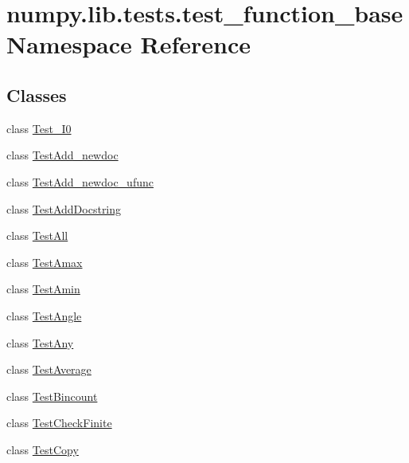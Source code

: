 \hypertarget{namespacenumpy_1_1lib_1_1tests_1_1test__function__base}{}\section{numpy.\+lib.\+tests.\+test\+\_\+function\+\_\+base Namespace Reference}
\label{namespacenumpy_1_1lib_1_1tests_1_1test__function__base}
\subsection*{Classes}
\begin{DoxyCompactItemize}
\item 
class \hyperlink{classnumpy_1_1lib_1_1tests_1_1test__function__base_1_1Test__I0}{Test\+\_\+\+I0}
\item 
class \hyperlink{classnumpy_1_1lib_1_1tests_1_1test__function__base_1_1TestAdd__newdoc}{Test\+Add\+\_\+newdoc}
\item 
class \hyperlink{classnumpy_1_1lib_1_1tests_1_1test__function__base_1_1TestAdd__newdoc__ufunc}{Test\+Add\+\_\+newdoc\+\_\+ufunc}
\item 
class \hyperlink{classnumpy_1_1lib_1_1tests_1_1test__function__base_1_1TestAddDocstring}{Test\+Add\+Docstring}
\item 
class \hyperlink{classnumpy_1_1lib_1_1tests_1_1test__function__base_1_1TestAll}{Test\+All}
\item 
class \hyperlink{classnumpy_1_1lib_1_1tests_1_1test__function__base_1_1TestAmax}{Test\+Amax}
\item 
class \hyperlink{classnumpy_1_1lib_1_1tests_1_1test__function__base_1_1TestAmin}{Test\+Amin}
\item 
class \hyperlink{classnumpy_1_1lib_1_1tests_1_1test__function__base_1_1TestAngle}{Test\+Angle}
\item 
class \hyperlink{classnumpy_1_1lib_1_1tests_1_1test__function__base_1_1TestAny}{Test\+Any}
\item 
class \hyperlink{classnumpy_1_1lib_1_1tests_1_1test__function__base_1_1TestAverage}{Test\+Average}
\item 
class \hyperlink{classnumpy_1_1lib_1_1tests_1_1test__function__base_1_1TestBincount}{Test\+Bincount}
\item 
class \hyperlink{classnumpy_1_1lib_1_1tests_1_1test__function__base_1_1TestCheckFinite}{Test\+Check\+Finite}
\item 
class \hyperlink{classnumpy_1_1lib_1_1tests_1_1test__function__base_1_1TestCopy}{Test\+Copy}

\end{DoxyCompactItemize}
